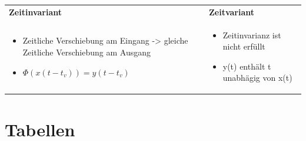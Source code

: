 \documentclass[margin=normal]{tex/hsrzf}
\begin{document}
\begin{tabular}{|p{10cm}|p{10cm}|}
      \\
      \rowcolor{TabularTitleColor}
      \textbf{Zeitinvariant} & \textbf{Zeitvariant}\\
      \begin{itemize}
            \item Zeitliche Verschiebung am Eingang -> gleiche Zeitliche Verschiebung am Ausgang
            \item $\Phi(x(t-t_v)) = y(t-t_v)$
      \end{itemize} 
      &
      \begin{itemize}
            \item Zeitinvarianz ist nicht erfüllt
            \item y(t) enthält t unabhägig von x(t)
      \end{itemize} 
      \\
      \hline
  
\end{tabular}


\newpage




\section{Tabellen}
\end{document}

